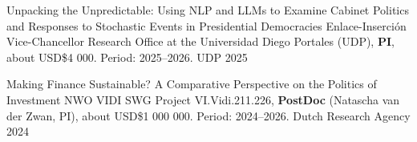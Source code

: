 





\vspace{1mm}

\begin{cvhonors}
\cvhonor
{Unpacking the Unpredictable: Using NLP and LLMs to Examine Cabinet Politics and Responses to Stochastic Events in Presidential Democracies}
{Enlace-Inserción Vice-Chancellor Research Office at the Universidad Diego Portales (UDP), {\bfseries PI}, about USD\$4 000. Period: 2025--2026.} 
{UDP}
{2025}
\end{cvhonors}

\vspace{1mm}

\begin{cvhonors}
\cvhonor
{Making Finance Sustainable? A Comparative Perspective on the Politics of Investment}
{NWO VIDI SWG Project VI.Vidi.211.226, {\bfseries PostDoc} (Natascha van der Zwan, PI), about USD\$1 000 000. Period: 2024--2026.} %
{Dutch Research Agency}
{2024}
\end{cvhonors}

\vspace{1mm}


